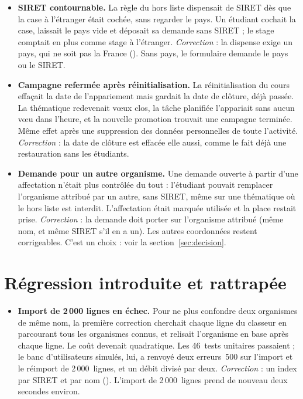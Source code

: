 \documentclass[11pt,a4paper]{article}
\newcommand{\grav}[1]{\textbf{\textcolor{#1}{\textbullet}}}
\newcommand{\maj}{\grav{orange}}
\begin{document}
\begin{itemize}
  \item[\maj] \textbf{SIRET contournable.} La règle du hors liste dispensait de SIRET dès que la
    case \og à l'étranger\fg{} était cochée, sans regarder le pays. Un étudiant cochait la case,
    laissait le pays vide et déposait sa demande sans SIRET ; le stage comptait en plus comme stage
    à l'étranger. \emph{Correction} : la dispense exige un pays, qui ne soit pas la France
    (). Sans pays, le formulaire demande le pays ou le SIRET.
  \item[\maj] \textbf{Campagne refermée après réinitialisation.} La réinitialisation du cours
    effaçait la date de l'appariement mais gardait la date de clôture, déjà passée. La thématique
    redevenait \og vœux clos\fg{}, la tâche planifiée l'appariait sans aucun vœu dans l'heure, et
    la nouvelle promotion trouvait une campagne terminée. Même effet après une suppression des
    données personnelles de toute l'activité. \emph{Correction} : la date de clôture est effacée
    elle aussi, comme le fait déjà une restauration sans les étudiants.
  \item[\maj] \textbf{Demande pour un autre organisme.} Une demande ouverte à partir d'une
    affectation n'était plus contrôlée du tout : l'étudiant pouvait remplacer l'organisme attribué
    par un autre, sans SIRET, même sur une thématique où le hors liste est interdit. L'affectation
    était marquée utilisée et la place restait prise. \emph{Correction} : la demande doit porter
    sur l'organisme attribué (même nom, et même SIRET s'il en a un). Les autres coordonnées restent
    corrigeables. C'est un choix : voir la section~\ref{sec:decision}.
\end{itemize}

\section{Régression introduite et rattrapée}\label{sec:regression}

\begin{itemize}
  \item[\maj] \textbf{Import de 2\,000 lignes en échec.} Pour ne plus confondre deux organismes de
    même nom, la première correction cherchait chaque ligne du classeur en parcourant tous les
    organismes connus, et relisait l'organisme en base après chaque ligne. Le coût devenait
    quadratique. Les 46~tests unitaires passaient ; le banc d'utilisateurs simulés, lui, a renvoyé
    deux erreurs~500 sur l'import et le réimport de 2\,000~lignes, et un débit divisé par deux.
    \emph{Correction} : un index par SIRET et par nom
    (). L'import de 2\,000~lignes prend de nouveau deux secondes
    environ.
\end{itemize}
\end{document}
